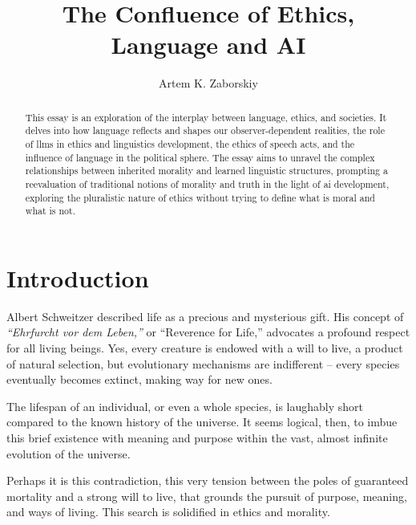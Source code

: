 \documentclass[11pt,a4]{article}
\begin{document}
\title{The Confluence of Ethics, Language and AI}

\author{Artem K. Zaborskiy}


\maketitle




\begin{abstract}



This essay is an exploration of the interplay between language, ethics,
and societies. It delves into how language reflects and shapes our
observer-dependent realities, the role of \glspl{llm} in ethics and
linguistics development, the ethics of speech acts, and the influence
of language in the political sphere. The essay aims to unravel the
complex relationships between inherited morality and learned linguistic
structures, prompting a reevaluation of traditional notions of
morality and truth in the light of \gls{ai} development,
exploring the pluralistic nature of ethics without trying
to define what is moral and what is not.
\end{abstract}

\tableofcontents
\printglossary[type=\acronymtype]





\section{Introduction}

    Albert Schweitzer described life as a precious and mysterious
    gift\cite{Schweitzer}. His concept of \textit{“Ehrfurcht vor dem Leben,”}
    or “Reverence for Life,” advocates a profound respect for all living beings.
    Yes, every creature is endowed with a will to live, a product of
    natural selection, but evolutionary mechanisms are indifferent
    – every species eventually becomes extinct, making way for new ones.
    \par
    The lifespan of an individual, or even a whole species, is
    laughably short compared to the known history of the universe.
    It seems logical, then, to imbue this brief existence with
    meaning and purpose within the vast, almost infinite
    evolution of the universe.
    \par
    Perhaps it is this contradiction, this very tension
    between the poles of guaranteed mortality and a
    strong will to live, that grounds the pursuit of
    purpose, meaning, and ways of living. This search
    is solidified in ethics and morality.
\end{document}
